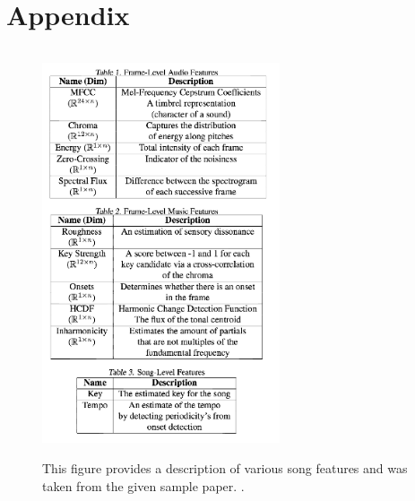 \documentclass{article} %
\begin{document}
\section{Appendix} \label{section:appendix}
\begin{figure}[V]
\includegraphics[height=120mm, width=70mm]{features}
\caption{This figure provides a description of various song features and was taken from the given sample paper. \cite{sample}.}
\label{fig:featureSet}
\end{figure}
\end{document}
